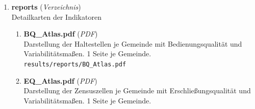 \begin{enumerate}[label=\arabic*., leftmargin=*, itemsep=0.5em, topsep=0.3em]
\begin{enumerate}[label=\arabic{enumi}.\arabic*, leftmargin=*, itemsep=0.5em, topsep=0.3em]
\begin{enumerate}[label=\arabic{enumi}.\arabic{enumii}.\arabic*, leftmargin=*, itemsep=0.5em, topsep=0.3em]
\begin{enumerate}[label=\arabic{enumi}.\arabic{enumii}.\arabic{enumiii}.\arabic*, leftmargin=*, itemsep=0.5em, topsep=0.3em]
Übersichtsgrafik zur stündlichen Entwicklung der mittelzentralen Anbindung je Gemeinde\\
\texttt{\small results/figures/perci3/Gemeinde\_i3-mz\_per\_hour.svg}
\item \textbf{Gemeinde\_i3-oz\_per\_hour.svg} \textnormal{(\textit{SVG})}\\
Übersichtsgrafik zur stündlichen Entwicklung der oberzentralen Anbindung je Gemeinde\\
\texttt{\small results/figures/perci3/Gemeinde\_i3-oz\_per\_hour.svg}
\item \textbf{Gemeinde\_tt\_i3-gz\_per\_hour.svg} \textnormal{(\textit{SVG})}\\
Übersichtsgrafik zur stündlichen Entwicklung der Reisezeit in Grundzentren je Gemeinde\\
\texttt{\small results/figures/perci3/Gemeinde\_tt\_i3-gz\_per\_hour.svg}
\item \textbf{Gemeinde\_tt\_i3-mz\_per\_hour.svg} \textnormal{(\textit{SVG})}\\
Übersichtsgrafik zur stündlichen Entwicklung der Reisezeit in Mittelzentren je Gemeinde\\
\texttt{\small results/figures/perci3/Gemeinde\_tt\_i3-mz\_per\_hour.svg}
\item \textbf{Gemeinde\_tt\_i3-oz\_per\_hour.svg} \textnormal{(\textit{SVG})}\\
Übersichtsgrafik zur stündlichen Entwicklung der Reisezeit in Oberzentren je Gemeinde\\
\texttt{\small results/figures/perci3/Gemeinde\_tt\_i3-oz\_per\_hour.svg}
\end{enumerate}
\end{enumerate}
\item \textbf{reports} \textnormal{(\textit{Verzeichnis})}\\
Detailkarten der Indikatoren
\begin{enumerate}[label=\arabic{enumi}.\arabic{enumii}.\arabic*, leftmargin=*, itemsep=0.5em, topsep=0.3em]
\item \textbf{BQ\_Atlas.pdf} \textnormal{(\textit{PDF})}\\
Darstellung der Haltestellen je Gemeinde mit Bedienungsqualität und Variabilitätsmaßen. 1 Seite je Gemeinde.\\
\texttt{\small results/reports/BQ\_Atlas.pdf}
\item \textbf{EQ\_Atlas.pdf} \textnormal{(\textit{PDF})}\\
Darstellung der Zensuszellen je Gemeinde mit Erschließungsqualität und Variabilitätsmaßen. 1 Seite je Gemeinde.\\

\end{enumerate}
\end{enumerate}
\end{enumerate}

